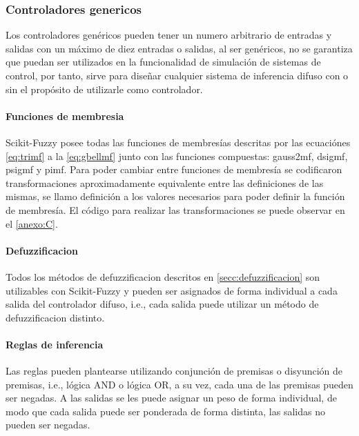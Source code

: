         \subsubsection{Controladores genericos}

            Los controladores genéricos pueden tener un numero arbitrario de entradas y salidas con un máximo de diez entradas o salidas, al ser genéricos, no se garantiza que puedan ser utilizados en la funcionalidad de simulación de sistemas de control, por tanto, sirve para diseñar cualquier sistema de inferencia difuso con o sin el propósito de utilizarle como controlador.

            \paragraph{Funciones de membresia}

                Scikit-Fuzzy posee todas las funciones de membresías descritas por las ecuaciónes \cref{eq:trimf} a la \cref{eq:gbellmf} junto con las funciones compuestas: gauss2mf, dsigmf, psigmf y pimf. Para poder cambiar entre funciones de membresía se codificaron transformaciones aproximadamente equivalente entre las definiciones de las mismas, se llamo definición a los valores necesarios para poder definir la función de membresía. El código para realizar las transformaciones se puede observar en el \ref{anexo:C}.

            \paragraph{Defuzzificacion}

                Todos los métodos de defuzzificacion descritos en \cref{secc:defuzzificacion} son utilizables con Scikit-Fuzzy y pueden ser asignados de forma individual a cada salida del controlador difuso, i.e., cada salida puede utilizar un método de defuzzificacion distinto.

            \paragraph{Reglas de inferencia}

                Las reglas pueden plantearse utilizando conjunción de premisas o disyunción de premisas, i.e., lógica AND o lógica OR, a su vez, cada una de las premisas pueden ser negadas. A las salidas se les puede asignar un peso de forma individual, de modo que cada salida puede ser ponderada de forma distinta, las salidas no pueden ser negadas.

